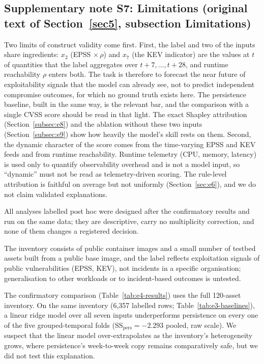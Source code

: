 \documentclass[pdflatex,sn-basic]{sn-jnl}
\theoremstyle{thmstyleone}%
\theoremstyle{thmstyletwo}%
\theoremstyle{thmstylethree}%
\begin{document}
\subsection*{Supplementary note S7: Limitations (original text of Section~\ref{sec5}, subsection Limitations)}
Two limits of construct validity come first. First, the label and two of the inputs share ingredients: $x_2$ (EPSS $\times\,\rho$) and $x_7$ (the KEV indicator) are the values at $t$ of quantities that the label aggregates over $t{+}7,\dots,t{+}28$, and runtime reachability $\rho$ enters both. The task is therefore to forecast the near future of exploitability signals that the model can already see, not to predict independent compromise outcomes, for which no ground truth exists here. The persistence baseline, built in the same way, is the relevant bar, and the comparison with a single CVSS score should be read in that light. The exact Shapley attribution (Section~\ref{subsec:e8}) and the ablation without these two inputs (Section~\ref{subsec:e9}) show how heavily the model's skill rests on them. Second, the dynamic character of the score comes from the time-varying EPSS and KEV feeds and from runtime reachability. Runtime telemetry (CPU, memory, latency) is used only to quantify observability overhead and is not a model input, so ``dynamic'' must not be read as telemetry-driven scoring. The rule-level attribution is faithful on average but not uniformly (Section~\ref{sec:e6}), and we do not claim validated explanations.


All analyses labelled post hoc were designed after the confirmatory results and run on the same data; they are descriptive, carry no multiplicity correction, and none of them changes a registered decision.

The inventory consists of public container images and a small number of testbed assets built from a public base image, and the label reflects exploitation signals of public vulnerabilities (EPSS, KEV), not incidents in a specific organisation; generalisation to other workloads or to incident-based outcomes is untested.

The confirmatory comparison (Table~\ref{tab:e4-results}) uses the full 120-asset inventory. On the same inventory (6{,}357 labelled rows; Table~\ref{tab:e3-baselines}), a linear ridge model over all seven inputs underperforms persistence on every one of the five grouped-temporal folds ($\mathrm{SS}_{\mathrm{pers}}=-2.293$ pooled, raw scale). We suspect that the linear model over-extrapolates as the inventory's heterogeneity grows, where persistence's week-to-week copy remains comparatively safe, but we did not test this explanation.
\end{document}
